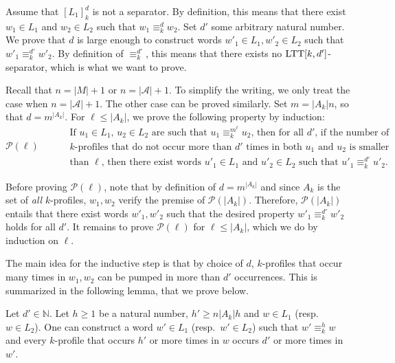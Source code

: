 \documentclass{LMCS}
\newcommand\nat{\ensuremath{\mathbb{N}}\xspace}
\newcommand\As{\ensuremath{\mathcal{A}}\xspace}
\newcommand\Ps{\ensuremath{\mathcal{P}}\xspace}
\newcommand{\ltt}{\textup{LTT}\xspace}
\newcommand\profile[1]{$#1$-profile\xspace}
\newcommand\profiles[1]{$#1$-profiles\xspace}
\newcommand\kprofile{\profile{k}}
\newcommand\kprofiles{\profiles{k}}
\newcommand\ltteq[2]{\ensuremath{\equiv_{#1}^{#2}}\xspace}
\newcommand\kdltteq{\ltteq{k}{d}}
\newcommand{\lttclos}[3]{\ensuremath{[#1]_{#2}^{#3}}}
\let\leq\leqslant
\let\ge\geqslant
\let\geq\geqslant
\theoremstyle{plain}
\begin{document}
\smallskip
Assume that $\lttclos{L_1}{k}{d}$ is not a separator. By definition,
this means that there exist $w_1 \in L_1$ and $w_2 \in L_2$ such that
$w_1 \kdltteq w_2$. Set $d'$ some arbitrary natural number. We prove that $d$
is large enough to construct words $w'_1 \in L_1,w'_2 \in L_2$ such
that $w'_1 \ltteq{k}{d'} w'_2$. By definition of $\ltteq{k}{d'}$, this
means that there exists no $\ltt[k,d']$-separator, which is what we
want to prove.

\smallskip
Recall that $n=|M| + 1$ or $n=|\As|+1$. To simplify the writing, we only treat the case when
$n=|\As|+1$.  The other case can be proved similarly. 
Set $m=|A_k|n$, so that $d=m^{|A_k|}$. For $\ell \leq |A_k|$, we 
prove the following property by induction:
\begin{equation*}
  \Ps(\ell)\qquad
  \begin{aligned}
    &\text{If $u_1\in L_1$, $u_2 \in L_2$ are such that $u_1
      \ltteq{k}{m^{\ell}} u_2$, then for all $d'$, if the number of}\\[-1ex]
    &\text{\kprofiles that do not
      occur more than $d'$ times in both $u_1$ and $u_2$ is smaller}\\[-1ex]
    &\text{than $\ell$, then there exist words $u'_1 \in L_1$ and $u'_2 \in
      L_2$ such that $u'_1 \ltteq{k}{d'} u'_2$.}
  \end{aligned}
\end{equation*}

Before proving $\Ps(\ell)$, note that by definition of $d=m^{|A_k|}$ and since $A_k$ is the set of
\emph{all} \kprofiles, $w_1,w_2$ verify the premise of
$\Ps(|A_k|)$. Therefore, $ \Ps(|A_k|)$ entails that there exist words
$w'_1,w'_2$ such that the desired property $w'_1 \ltteq{k}{d'} w'_2$
holds for all $d'$. It remains to prove $\Ps(\ell)$ for $\ell \leq |A_k|$, which we do by
induction on $\ell$.


The main idea for the inductive step is that by choice of $d$,
\kprofiles that occur many times in $w_1,w_2$ can be pumped in more
than $d'$ occurrences. This is summarized in the following lemma, that
we prove below.

\begin{lem}
  \label{lem:thresholdpump}
  Let $d'\in\nat$. Let $h\ge1$ be a natural number, $h' \geq n|A_k|h$ and $w
  \in L_1$ (resp.~$w \in L_2$). One can construct a word $w' \in L_1$
  (resp.~$w' \in L_2$) such that $w' \ltteq{k}{h} w$ and every
  \kprofile that occurs $h'$ or more times in $w$ occurs $d'$ or more
  times in $w'$.
\end{lem}
\end{document}
